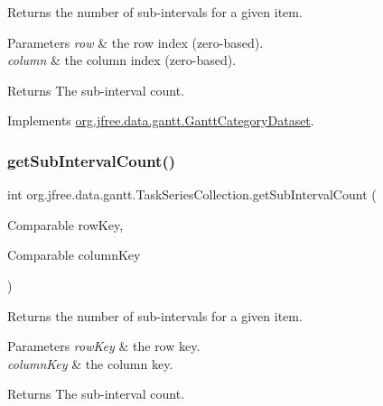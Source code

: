Returns the number of sub-\/intervals for a given item.


\begin{DoxyParams}{Parameters}
{\em row} & the row index (zero-\/based). \\
\hline
{\em column} & the column index (zero-\/based).\\
\hline
\end{DoxyParams}
\begin{DoxyReturn}{Returns}
The sub-\/interval count. 
\end{DoxyReturn}


Implements \mbox{\hyperlink{interfaceorg_1_1jfree_1_1data_1_1gantt_1_1_gantt_category_dataset_a290ee496bed2a6688f43e56c0824bb01}{org.\+jfree.\+data.\+gantt.\+Gantt\+Category\+Dataset}}.

\mbox{\label{classorg_1_1jfree_1_1data_1_1gantt_1_1_task_series_collection_af4aa8478ec30350d17361e896ef45ee7}} 
\subsubsection{\texorpdfstring{get\+Sub\+Interval\+Count()}{getSubIntervalCount()}\hspace{0.1cm}{\footnotesize\ttfamily [2/2]}}
{\footnotesize\ttfamily int org.\+jfree.\+data.\+gantt.\+Task\+Series\+Collection.\+get\+Sub\+Interval\+Count (\begin{DoxyParamCaption}\item[{Comparable}]{row\+Key,  }\item[{Comparable}]{column\+Key }\end{DoxyParamCaption})}

Returns the number of sub-\/intervals for a given item.


\begin{DoxyParams}{Parameters}
{\em row\+Key} & the row key. \\
\hline
{\em column\+Key} & the column key.\\
\hline
\end{DoxyParams}
\begin{DoxyReturn}{Returns}
The sub-\/interval count. 
\end{DoxyReturn}


